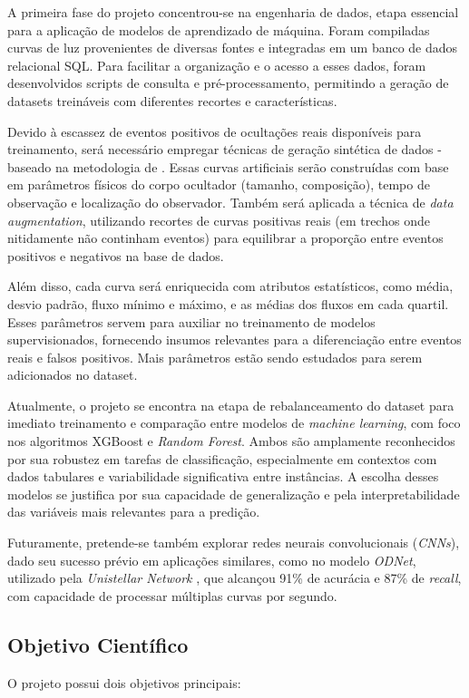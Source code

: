 \documentclass[12pt]{article}
\numberwithin{equation}{section}
\begin{document}
A primeira fase do projeto concentrou-se na engenharia de dados, etapa essencial para a aplicação de modelos de aprendizado de máquina. Foram compiladas curvas de luz provenientes de diversas fontes e integradas em um banco de dados relacional SQL. Para facilitar a organização e o acesso a esses dados, foram desenvolvidos scripts de consulta e pré-processamento, permitindo a geração de datasets treináveis com diferentes recortes e características.

Devido à escassez de eventos positivos de ocultações reais disponíveis para treinamento, será necessário empregar técnicas de geração sintética de dados - baseado na metodologia de \cite{Simulator}. Essas curvas artificiais serão construídas com base em parâmetros físicos do corpo ocultador (tamanho, composição), tempo de observação e localização do observador. Também será aplicada a técnica de \textit{data augmentation}, utilizando recortes de curvas positivas reais (em trechos onde nitidamente não continham eventos) para equilibrar a proporção entre eventos positivos e negativos na base de dados. 

Além disso, cada curva será enriquecida com atributos estatísticos, como média, desvio padrão, fluxo mínimo e máximo, e as médias dos fluxos em cada quartil. Esses parâmetros servem para auxiliar no treinamento de modelos supervisionados, fornecendo insumos relevantes para a diferenciação entre eventos reais e falsos positivos. Mais parâmetros estão sendo estudados para serem adicionados no dataset.

Atualmente, o projeto se encontra na etapa de rebalanceamento do dataset para imediato treinamento e comparação entre modelos de \textit{machine learning}, com foco nos algoritmos XGBoost e \textit{Random Forest}. Ambos são amplamente reconhecidos por sua robustez em tarefas de classificação, especialmente em contextos com dados tabulares e variabilidade significativa entre instâncias. A escolha desses modelos se justifica por sua capacidade de generalização e pela interpretabilidade das variáveis mais relevantes para a predição.

Futuramente, pretende-se também explorar redes neurais convolucionais (\textit{CNNs}), dado seu sucesso prévio em aplicações similares, como no modelo \textit{ODNet}, utilizado pela \textit{Unistellar Network} \cite{Cazeneuve_2023}, que alcançou 91\% de acurácia e 87\% de \textit{recall}, com capacidade de processar múltiplas curvas por segundo. %


\subsection{Objetivo Científico}
\indent
O projeto possui dois objetivos principais:
\end{document}
